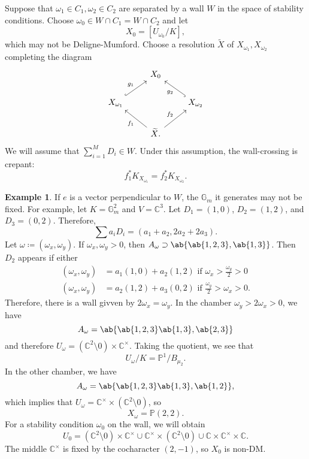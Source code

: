 \documentclass[leqno, openany]{memoir}
\theoremstyle{definition}
\newtheorem{exm}[thm]{Example}
\theoremstyle{remark}
\theoremstyle{plain}
\theoremstyle{definition}
\theoremstyle{remark}
\newcommand{\G}{\mathbb{G}}
\newcommand{\C}{\mathbb{C}}
\renewcommand{\P}{\mathbb{P}}
\newcommand{\wt}[1]{\widetilde{#1}}
\begin{document}
Suppose that $\omega_1 \in C_1, \omega_2 \in C_2$ are separated by a wall $W$ in the space of stability conditions. Choose $\omega_0 \in W \cap C_1 = W \cap C_2$ and let
\[ X_0 = [U_{\omega_0}/K], \]
which may not be Deligne-Mumford. Choose a resolution $\wt{X}$ of $X_{\omega_1}, X_{\omega_2}$ completing the diagram
\begin{equation*}
\begin{tikzcd}
    & X_0 \\
    X_{\omega_1} \ar[hookrightarrow]{ur}{g_1} && X_{\omega_2} \ar[hookrightarrow]{ul}{g_2} \\
    & \wt{X} \ar{ur}{f_2} \ar{ul}{f_1}.
\end{tikzcd}
\end{equation*}
We will assume that $\sum_{i=1}^M D_i \in W$. Under this assumption, the wall-crossing is crepant:
\[ f_1^* K_{X_{\omega_1}} = f_2^* K_{X_{\omega_2}}. \]

\begin{exm}
    If $e$ is a vector perpendicular to $W$, the $\mathbb{G}_m$ it generates may not be fixed. For example, let $K = \G_m^2$ and $V = \C^3$. Let $D_1 = (1,0)$, $D_2 = (1,2)$, and $D_3 = (0,2)$. Therefore, 
    \[ \sum a_i D_i = (a_1 + a_2, 2a_2 + 2a_3). \]
    Let $\omega \coloneqq (\omega_x, \omega_y)$. If $\omega_x, \omega_y > 0$, then $A_{\omega} \supset \ab\{\ab\{1,2,3\},\ab\{1,3\}\}$. Then $D_2$ appears if either
    \begin{align*}
        (\omega_x, \omega_y) &= a_1(1,0) + a_2 (1,2) \text{ if } \omega_x > \frac{\omega_y}{2} > 0 \\
        (\omega_x, \omega_y) &= a_2 (1,2) + a_3(0,2) \text{ if } \frac{\omega_y}{2} > \omega_x > 0.
    \end{align*}
    Therefore, there is a wall givven by $2 \omega_x = \omega_y$. In the chamber $\omega_y > 2\omega_x > 0$, we have
    \[ A_{\omega} = \ab\{\ab\{1,2,3\} \ab\{1,3\},\ab\{2,3\}\} \]
    and therefore $U_{\omega} = (\C^2 \setminus 0) \times \C^{\times}$. Taking the quotient, we see that
    \[ U_{\omega} / K = \P^1 / B_{\mu_2}. \]
    In the other chamber, we have
    \[ A_{\omega} = \ab\{\ab\{1,2,3\} \ab\{1,3\},\ab\{1,2\}\}, \]
    which implies that $U_{\omega} = \C^{\times} \times (\C^2 \setminus 0)$, so
    \[ X_{\omega} = \P(2,2). \]
    For a stability condition $\omega_0$ on the wall, we will obtain
    \[ U_0 = (\C^2 \setminus 0) \times \C^{\times} \cup \C^{\times} \times (\C^2 \setminus 0) \cup \C \times \C^{\times} \times \C. \]
    The middle $\C^{\times}$ is fixed by the cocharacter $(2,-1)$, so $X_0$ is non-DM.
\end{exm}
\end{document}
